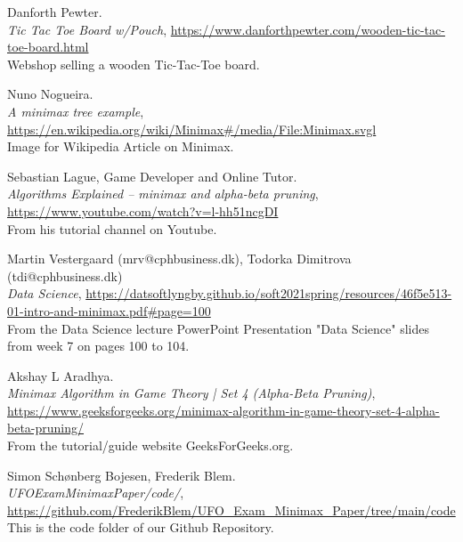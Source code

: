 \begin{thebibliography}{1}
    \label{thebibliography}

    \label{bib:Tic-Tac-ToeBoard}
    Danforth Pewter.\\
    \textit{Tic Tac Toe Board w/Pouch}, \url{https://www.danforthpewter.com/wooden-tic-tac-toe-board.html}\\
    Webshop selling a wooden Tic-Tac-Toe board.

    \label{bib:MinimaxTreeExample}
    Nuno Nogueira.\\
    \textit{A minimax tree example}, \url{https://en.wikipedia.org/wiki/Minimax#/media/File:Minimax.svgl}\\
    Image for Wikipedia Article on Minimax.

    \label{bib:MinimaxVideo}
    Sebastian Lague, Game Developer and Online Tutor.\\
    \textit{Algorithms Explained – minimax and alpha-beta pruning}, \url{https://www.youtube.com/watch?v=l-hh51ncgDI}\\
    From his tutorial channel on Youtube.

    \label{bib:AlphaBetaSlides}
    Martin Vestergaard (mrv@cphbusiness.dk), Todorka Dimitrova (tdi@cphbusiness.dk)\\
    \textit{Data Science}, \url{https://datsoftlyngby.github.io/soft2021spring/resources/46f5e513-01-intro-and-minimax.pdf#page=100}\\
    From the Data Science lecture PowerPoint Presentation "Data Science" slides from week 7 on pages 100 to 104.

    \label{bib:MinimaxAlphaBetaArticle}
    Akshay L Aradhya.\\
    \textit{Minimax Algorithm in Game Theory | Set 4 (Alpha-Beta Pruning)}, \url{https://www.geeksforgeeks.org/minimax-algorithm-in-game-theory-set-4-alpha-beta-pruning/}\\
    From the tutorial/guide website GeeksForGeeks.org.

    \label{bib:OurCode}
    Simon Schønberg Bojesen, Frederik Blem.\\
    \textit{UFO\textunderscore Exam\textunderscore Minimax\textunderscore Paper/code/}, \url{https://github.com/FrederikBlem/UFO_Exam_Minimax_Paper/tree/main/code}\\
    This is the code folder of our Github Repository.


\end{thebibliography}
